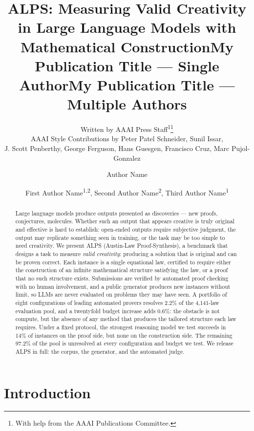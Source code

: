 \documentclass[letterpaper]{article} %
\title{ALPS: Measuring Valid Creativity in Large Language Models with Mathematical Construction}
\author{
    Written by AAAI Press Staff\textsuperscript{\rm 1}\thanks{With help from the AAAI Publications Committee.}\\
    AAAI Style Contributions by Peter Patel Schneider,
    Sunil Issar,\\
    J. Scott Penberthy,
    George Ferguson,
    Hans Guesgen,
    Francisco Cruz\equalcontrib\corresponding,
    Marc Pujol-Gonzalez\equalcontrib\corresponding
}
\title{My Publication Title --- Single Author}
\author {
    Author Name
}
\title{My Publication Title --- Multiple Authors}
\author {
    First Author Name\textsuperscript{\rm 1,\rm 2}\equalcontrib,
    Second Author Name\textsuperscript{\rm 2}\equalcontrib,
    Third Author Name\textsuperscript{\rm 1}\corresponding
}
\begin{document}
\maketitle

\begin{abstract}
Large language models produce outputs presented as discoveries — new proofs, conjectures, molecules. Whether such an output that appears creative is truly original and effective is hard to establish: open-ended outputs require subjective judgment, the output may replicate something seen in training, or the task may be too simple to need creativity. We present ALPS (Austin-Law Proof-Synthesis), a benchmark that designs a task to measure \emph{valid creativity}: producing a solution that is original and can be proven correct. Each instance is a single equational law, certified to require either the construction of an infinite mathematical structure satisfying the law, or a proof that no such structure exists. Submissions are verified by automated proof checking with no human involvement, and a public generator produces new instances without limit, so LLMs are never evaluated on problems they may have seen. A portfolio of eight configurations of leading automated provers resolves 2.2\% of the 4,141-law evaluation pool, and a twentyfold budget increase adds 0.6\%: the obstacle is not compute, but the absence of any method that produces the tailored structure each law requires. Under a fixed protocol, the strongest reasoning model we test succeeds in 14\% of instances on the proof side, but none on the construction side. The remaining 97.2\% of the pool is unresolved at every configuration and budget we test. We release ALPS in full: the corpus, the generator, and the automated judge.

\end{abstract}


\section{Introduction}
\end{document}
